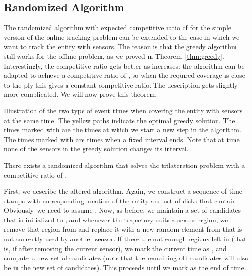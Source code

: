 \documentclass[runningheads]{llncs}
\newcommand{\marrow}{\marginpar[\hfill]{}}
\renewcommand{\remark}[3]{\textcolor{blue}{\textsc{#1 #2:}}
\textcolor{red}{\marrow\textsf{#3}}}
\renewcommand{\remark}[3]{\relax}
\newcommand{\maarten}[2][says]{\remark{Maarten}{#1}{#2}}
\begin{document}
  \subsection {Randomized Algorithm}
    \maarten {Ok, after thinking some more about it, it seems the algorithm extension is quite straightforward after all, it's just the analysis that gets a bit more complicated.}
    The randomized algorithm with expected competitive ratio of  for the simple version of the online tracking problem can be extended to the case in which we want to track the entity with  sensors.
    The reason is that the greedy algorithm still works for the offline problem, as we proved in Theorem~\ref {thm:greedy}.
    Interestingly, the competitive ratio gets better as  increases:
    the algorithm can be adapted to achieve a competitive ratio of , so when the required coverage is close to the ply this gives a constant competitive ratio. The description gets slightly more complicated. We will now prove this theorem.

     {Illustration of the two type of event times when covering the entity with  sensors at the same time. The yellow paths indicate the optimal greedy solution. The times marked with  are the times at which we start a new step in the algorithm. The times marked with  are times when a fixed interval ends. Note that at time  none of the sensors in the greedy solution changes its interval.}

\begin {theorem} \label {thm:trilateration-algorithm}
  There exists a randomized algorithm that solves the trilateration problem with a competitive ratio of .
\end {theorem}

    First, we describe the altered algorithm.
    Again, we construct a sequence of time stamps  with corresponding location of the entity  and set of disks  that contain . Obviously, we need to assume . Now, as before, we maintain a set of candidates  that is initialized to , and whenever the trajectory exits a sensor region, we remove that region from  and replace it with a new random element from  that is not currently used by another sensor. 
    If there are not enough regions left in  (that is, if  after removing the current sensor), we mark the current time as , and compute a new set of candidates (note that the  remaining old candidates will also be in the new set of candidates). This proceeds until we mark  as the end of time.
\maarten {need to add more pseudocode?}
\end{document}

